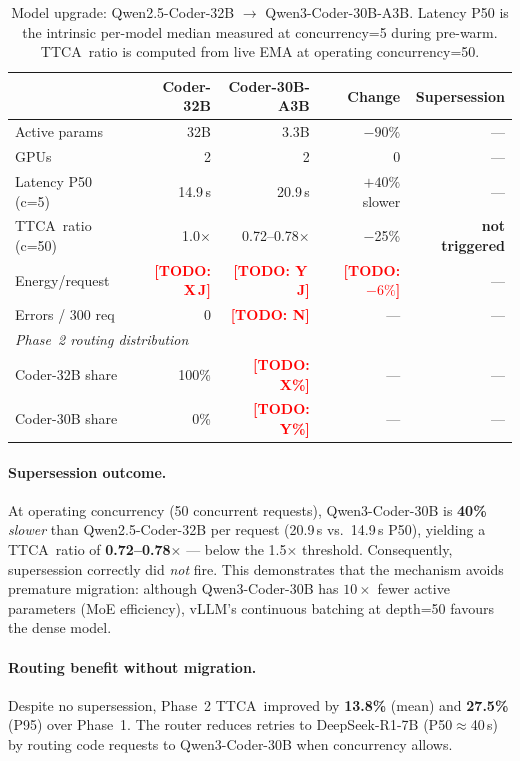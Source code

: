 \documentclass[11pt]{article}
\newcommand{\ttca}{\textsc{TTCA}\xspace}
\newcommand{\result}[1]{\textbf{#1}}
\newcommand{\todo}[1]{\textcolor{red}{[TODO: #1]}}
\begin{document}
\begin{table}[t]
  \centering
  \caption{%
    Model upgrade: Qwen2.5-Coder-32B $\to$ Qwen3-Coder-30B-A3B.
    Latency P50 is the intrinsic per-model median measured at concurrency=5
    during pre-warm.
    \ttca\ ratio is computed from live EMA at operating concurrency=50.%
  }
  \label{tab:upgrade}
  \small
  \begin{tabular}{lrrrr}
    \toprule
    & Coder-32B & Coder-30B-A3B & Change & Supersession \\
    \midrule
    Active params      & 32B    & 3.3B   & $-90\%$  & — \\
    GPUs               & 2      & 2      & 0        & — \\
    Latency P50 (c=5)  & 14.9\,s & 20.9\,s & $+40\%$ slower & — \\
    \ttca\ ratio (c=50) & 1.0$\times$ & 0.72--0.78$\times$ & $-$25\%  & \textbf{not triggered} \\
    Energy/request     & \result{\todo{X\,J}} & \result{\todo{Y\,J}} & \result{\todo{$-6\%$}} & — \\
    Errors / 300 req   & 0      & \result{\todo{N}} & —    & — \\
    \midrule
    \multicolumn{5}{l}{\textit{Phase~2 routing distribution}} \\
    Coder-32B share    & 100\%  & \result{\todo{X\%}} & — & — \\
    Coder-30B share    & 0\%    & \result{\todo{Y\%}} & — & — \\
    \bottomrule
  \end{tabular}
\end{table}

\paragraph{Supersession outcome.}
At operating concurrency (50 concurrent requests), Qwen3-Coder-30B
is \result{40\%} \emph{slower} than Qwen2.5-Coder-32B per request
(20.9\,s vs.\ 14.9\,s P50), yielding a \ttca\ ratio of
\result{0.72--0.78$\times$} — below the 1.5$\times$ threshold.
Consequently, supersession correctly did \emph{not} fire.
This demonstrates that the mechanism avoids premature migration:
although Qwen3-Coder-30B has $10\times$ fewer active parameters
(MoE efficiency), vLLM's continuous batching at depth=50 favours
the dense model.

\paragraph{Routing benefit without migration.}
Despite no supersession, Phase~2 \ttca\ improved by
\result{13.8\%} (mean) and \result{27.5\%} (P95) over Phase~1.
The router reduces retries to DeepSeek-R1-7B (P50$\approx$40\,s)
by routing code requests to Qwen3-Coder-30B when concurrency allows.
\end{document}
